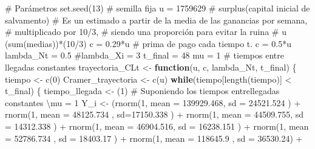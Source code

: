 \documentclass[
  us-letterpaper,
]{scrreprt}
\newenvironment{Shaded}{\begin{snugshade}}{\end{snugshade}}
\newcommand{\AttributeTok}[1]{\textcolor[rgb]{0.40,0.45,0.13}{#1}}
\newcommand{\CommentTok}[1]{\textcolor[rgb]{0.37,0.37,0.37}{#1}}
\newcommand{\ControlFlowTok}[1]{\textcolor[rgb]{0.00,0.23,0.31}{\textbf{#1}}}
\newcommand{\DecValTok}[1]{\textcolor[rgb]{0.68,0.00,0.00}{#1}}
\newcommand{\FloatTok}[1]{\textcolor[rgb]{0.68,0.00,0.00}{#1}}
\newcommand{\FunctionTok}[1]{\textcolor[rgb]{0.28,0.35,0.67}{#1}}
\newcommand{\NormalTok}[1]{\textcolor[rgb]{0.00,0.23,0.31}{#1}}
\newcommand{\OtherTok}[1]{\textcolor[rgb]{0.00,0.23,0.31}{#1}}
\newcommand{\SpecialCharTok}[1]{\textcolor[rgb]{0.37,0.37,0.37}{#1}}
\theoremstyle{plain}
\theoremstyle{plain}
\theoremstyle{definition}
\theoremstyle{remark}
\begin{document}
\begin{Shaded}
\begin{Highlighting}[]
\CommentTok{\# Parámetros}
\FunctionTok{set.seed}\NormalTok{(}\DecValTok{13}\NormalTok{) }\CommentTok{\# semilla fija}
\NormalTok{u }\OtherTok{=} \DecValTok{1759629} \CommentTok{\# surplus(capital inicial de salvamento)}
\CommentTok{\# Es un estimado a partir de la media de las ganancias por semana, }
\CommentTok{\# multiplicado por 10/3, }
\CommentTok{\# siendo una proporción para evitar la ruina}
\CommentTok{\# u (sum(medias))*(10/3)}
\NormalTok{c }\OtherTok{=} \FloatTok{0.29}\SpecialCharTok{*}\NormalTok{u }\CommentTok{\# prima de pago cada tiempo t. c = 0.5*u}
\NormalTok{lambda\_Nt }\OtherTok{=} \FloatTok{0.5}
\CommentTok{\#lambda\_Xi = 3}
\NormalTok{t\_final }\OtherTok{=} \DecValTok{48}
\NormalTok{mu }\OtherTok{=} \DecValTok{1} \CommentTok{\# tiempos entre llegadas constantes}
\NormalTok{trayectoria\_CLt }\OtherTok{\textless{}{-}} \ControlFlowTok{function}\NormalTok{(u, c, lambda\_Nt, t\_final)}
\NormalTok{\{}
\NormalTok{  tiempo }\OtherTok{\textless{}{-}} \FunctionTok{c}\NormalTok{(}\DecValTok{0}\NormalTok{)}
\NormalTok{  Cramer\_trayectoria }\OtherTok{\textless{}{-}} \FunctionTok{c}\NormalTok{(u)}
  \ControlFlowTok{while}\NormalTok{(tiempo[}\FunctionTok{length}\NormalTok{(tiempo)] }\SpecialCharTok{\textless{}}\NormalTok{ t\_final)}
\NormalTok{  \{}
\NormalTok{    tiempo\_llegada }\OtherTok{\textless{}{-}}\NormalTok{ (}\DecValTok{1}\NormalTok{) }
\CommentTok{\# Suponiendo los tiempos entrellegadas constantes \textbackslash{}mu = 1}
\NormalTok{    Y\_i }\OtherTok{\textless{}{-}}\NormalTok{  (}\FunctionTok{rnorm}\NormalTok{(}\DecValTok{1}\NormalTok{, }\AttributeTok{mean =} \FloatTok{139929.468}\NormalTok{, }\AttributeTok{sd =} \FloatTok{24521.524}\NormalTok{ ) }\SpecialCharTok{+} 
             \FunctionTok{rnorm}\NormalTok{(}\DecValTok{1}\NormalTok{, }\AttributeTok{mean =} \FloatTok{48125.734}\NormalTok{ , }\AttributeTok{sd=}\FloatTok{17150.338}\NormalTok{ ) }\SpecialCharTok{+}  
             \FunctionTok{rnorm}\NormalTok{(}\DecValTok{1}\NormalTok{, }\AttributeTok{mean =}  \FloatTok{44509.755}\NormalTok{, }\AttributeTok{sd =} \FloatTok{14312.338}\NormalTok{ ) }\SpecialCharTok{+} 
             \FunctionTok{rnorm}\NormalTok{(}\DecValTok{1}\NormalTok{, }\AttributeTok{mean =}   \FloatTok{46904.516}\NormalTok{, }\AttributeTok{sd =} \FloatTok{16238.151}\NormalTok{ ) }\SpecialCharTok{+} 
             \FunctionTok{rnorm}\NormalTok{(}\DecValTok{1}\NormalTok{, }\AttributeTok{mean =} \FloatTok{52786.734}\NormalTok{  , }\AttributeTok{sd =} \FloatTok{18403.17}\NormalTok{ ) }\SpecialCharTok{+} 
             \FunctionTok{rnorm}\NormalTok{(}\DecValTok{1}\NormalTok{, }\AttributeTok{mean =} \FloatTok{118645.9}\NormalTok{  , }\AttributeTok{sd =} \FloatTok{36530.24}\NormalTok{) }\SpecialCharTok{+}

\end{Highlighting}
\end{Shaded}
\end{document}
